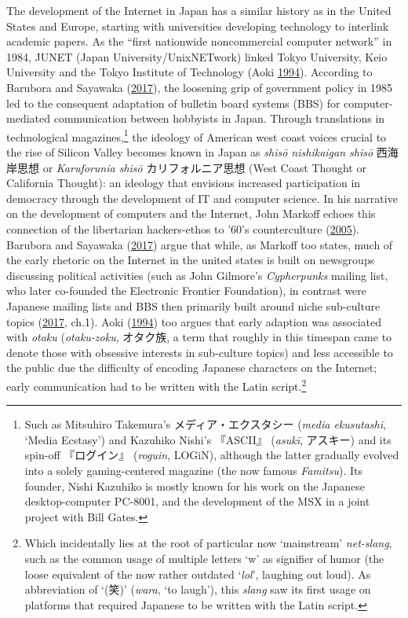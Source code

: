 \documentclass[10pt,british,A4paper,,openany]{memoir}
\begin{document}
The development of the Internet in Japan has a similar history as in the
United States and Europe, starting with universities developing
technology to interlink academic papers. As the ``first nationwide
noncommercial computer network'' in 1984, JUNET (Japan
University/UnixNETwork) linked Tokyo University, Keio University and the
Tokyo Institute of Technology (Aoki
\protect\hyperlink{ref-aoki_virtual_1994}{1994}). According to Barubora
and Sayawaka (\protect\hyperlink{ref-barubora_eng:_2017}{2017}), the
loosening grip of government policy in 1985 led to the consequent
adaptation of bulletin board systems (BBS) for computer-mediated
communication between hobbyists in Japan. Through translations in
technological magazines,\footnote{Such as Mitsuhiro Takemura's
  メディア・エクスタシー (\emph{media ekusutashī}, `Media Ecstasy') and
  Kazuhiko Nishi's 『ASCII』 (\emph{asukī}, アスキー) and its spin-off
  『ログイン』 (\emph{roguin}, LOGiN), although the latter gradually
  evolved into a solely gaming-centered magazine (the now famous
  \emph{Famitsu}). Its founder, Nishi Kazuhiko is mostly known for his
  work on the Japanese desktop-computer PC-8001, and the development of
  the MSX in a joint project with Bill Gates.} the ideology of American
west coast voices crucial to the rise of Silicon Valley becomes known in
Japan as \emph{shisō nishikaigan shisō} 西海岸思想 or \emph{Karuforunia
shisō} カリフォルニア思想 (West Coast Thought or California Thought): an
ideology that envisions increased participation in democracy through the
development of IT and computer science. In his narrative on the
development of computers and the Internet, John Markoff echoes this
connection of the libertarian hackers-ethos to '60's counterculture
(\protect\hyperlink{ref-markoff_what_2005}{2005}). Barubora and Sayawaka
(\protect\hyperlink{ref-barubora_eng:_2017}{2017}) argue that while, as
Markoff too states, much of the early rhetoric on the Internet in the
united states is built on newsgroups discussing political activities
(such as John Gilmore's \emph{Cypherpunks} mailing list, who later
co-founded the Electronic Frontier Foundation), in contrast were
Japanese mailing lists and BBS then primarily built around niche
sub-culture topics (\protect\hyperlink{ref-barubora_eng:_2017}{2017},
ch.1). Aoki (\protect\hyperlink{ref-aoki_virtual_1994}{1994}) too argues
that early adaption was associated with \emph{otaku} (\emph{otaku-zoku},
オタク族, a term that roughly in this timespan came to denote those with
obsessive interests in sub-culture topics) and less accessible to the
public due the difficulty of encoding Japanese characters on the
Internet; early communication had to be written with the Latin
script.\footnote{Which incidentally lies at the root of particular now
  `mainstream' \emph{net-slang}, such as the common usage of multiple
  letters `w' as signifier of humor (the loose equivalent of the now
  rather outdated `\emph{lol}', laughing out loud). As abbreviation of
  `(笑)' (\emph{wara}, `to laugh'), this \emph{slang} saw its first
  usage on platforms that required Japanese to be written with the Latin
  script.}
\end{document}
